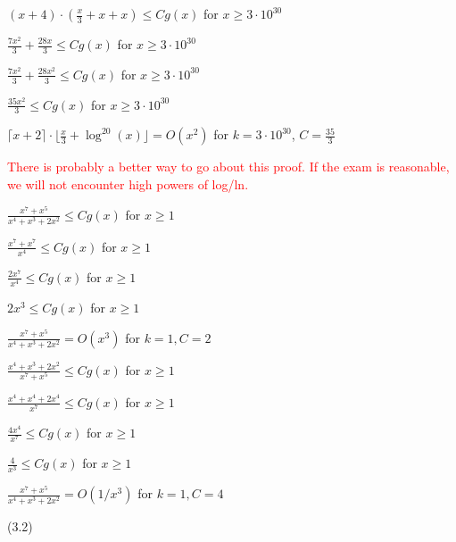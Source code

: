 \documentclass{exam}
\begin{document}
\begin{questions}
\begin{subparts}
\begin{center}
\( (x + 4) \cdot (\frac{x}{3} + x + x) \leq Cg(x)\) for \(x \geq 3 \cdot 10^{30}\)

\( \frac{7x^2}{3} + \frac{28x}{3} \leq Cg(x)\) for \(x \geq 3 \cdot 10^{30}\)

\( \frac{7x^2}{3} + \frac{28x^2}{3} \leq Cg(x)\) for \(x \geq 3 \cdot 10^{30}\)

\( \frac{35x^2}{3} \leq Cg(x)\) for \(x \geq 3 \cdot 10^{30}\)

\( \lceil x + 2 \rceil \cdot \lfloor \frac{x}{3} + \log^{20}(x) \rfloor = O(x^2)\) for \(k = 3\cdot10^{30}\), \(C = \frac{35}{3}\)

\textcolor{red}{There is probably a better way to go about this proof. If the exam is reasonable, we will not encounter high powers of log/ln.}

\end{center}


\begin{center}

\( \frac{x^7 + x^5}{x^4 + x^3 + 2x^2} \leq Cg(x)\) for \(x \geq 1\)

\( \frac{x^7 + x^7}{x^4} \leq Cg(x)\) for \(x \geq 1\)

\( \frac{2x^7}{x^4} \leq Cg(x)\) for \(x \geq 1\)

\( 2x^3 \leq Cg(x)\) for \(x \geq 1\)

\( \frac{x^7 + x^5}{x^4 + x^3 + 2x^2} = O(x^3)\) for \(k = 1, C = 2\)

\end{center}


\begin{center}

\( \frac{x^4 + x^3 + 2x^2}{x^7 + x^5} \leq Cg(x)\) for \(x \geq 1\)

\( \frac{x^4 + x^4 + 2x^4}{x^7} \leq Cg(x)\) for \(x \geq 1\)

\( \frac{4x^4}{x^7} \leq Cg(x)\) for \(x \geq 1\)

\( \frac{4}{x^3} \leq Cg(x)\) for \(x \geq 1\)

\( \frac{x^7 + x^5}{x^4 + x^3 + 2x^2} = O(1/x^3)\) for \(k = 1, C = 4\)

\end{center}

\end{subparts}

 (3.2)


\end{questions}
\end{document}
